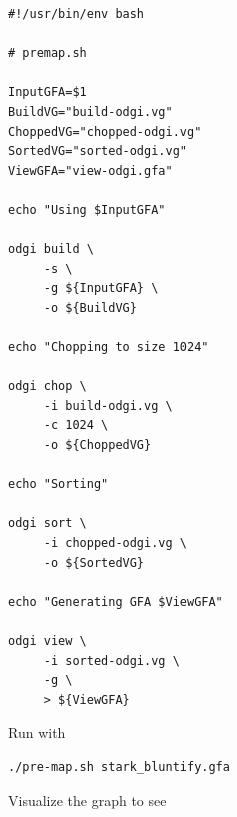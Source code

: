 \documentclass[a4paper]{article}
\begin{document}
\begin{verbatim}
#!/usr/bin/env bash

# premap.sh

InputGFA=$1
BuildVG="build-odgi.vg"
ChoppedVG="chopped-odgi.vg"
SortedVG="sorted-odgi.vg"
ViewGFA="view-odgi.gfa"

echo "Using $InputGFA"

odgi build \
     -s \
     -g ${InputGFA} \
     -o ${BuildVG}

echo "Chopping to size 1024"

odgi chop \
     -i build-odgi.vg \
     -c 1024 \
     -o ${ChoppedVG}

echo "Sorting"

odgi sort \
     -i chopped-odgi.vg \
     -o ${SortedVG}

echo "Generating GFA $ViewGFA"

odgi view \
     -i sorted-odgi.vg \
     -g \
     > ${ViewGFA}
\end{verbatim}

Run with

\begin{verbatim}
./pre-map.sh stark_bluntify.gfa
\end{verbatim}

Visualize the graph to see
\end{document}
